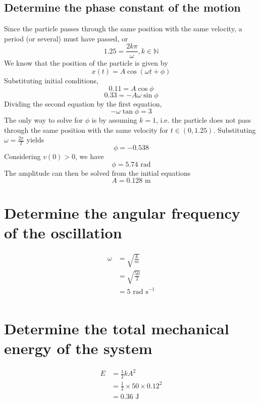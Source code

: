 \documentclass[answers]{exam}
\begin{document}
\begin{questions}
\begin{parts}
		\part{Determine the phase constant of the motion}
	\end{parts}
	\begin{solution}
		Since the particle passes through the same position with the same velocity, a period (or several) must have passed, or
		$$1.25 = \frac{2k\pi}{\omega}, k \in \mathbb{N}$$
		We know that the position of the particle is given by
		$$x(t) = A\cos(\omega t + \phi)$$
		Substituting initial conditions,
		$$0.11 = A\cos\phi$$
		$$0.33 = -A\omega\sin\phi$$
		Dividing the second equation by the first equation,
		$$-\omega\tan\phi = 3$$
		The only way to solve for $\phi$ is by assuming $k=1$, i.e. the particle does not pass through the same position with the same velocity for $t \in (0,1.25)$. Substituting $\omega = \frac{2\pi}{T}$ yields
		$$\phi = -0.538$$
		Considering $v(0) > 0$, we have
		$$\phi = 5.74 \text{ rad}$$
		The amplitude can then be solved from the initial equations
		$$A = 0.128 \text{ m}$$
	\end{solution}
	\begin{parts}
		\part{Determine the angular frequency of the oscillation}
		\begin{solution}
			\begin{align*}
				\omega &= \sqrt{\frac{k}{m}} \\
				       &= \sqrt{\frac{50}{2}} \\
				       &= 5 \text{ rad s}^{-1} \\
			\end{align*}
		\end{solution}
		\part{Determine the total mechanical energy of the system}
		\begin{solution}
			\begin{align*}
				E &= \frac{1}{2} kA^2 \\
				  &= \frac{1}{2} \times 50 \times 0.12^2 \\
				  &= 0.36 \text{ J} \\
			\end{align*}
		\end{solution}

\end{parts}
\end{questions}
\end{document}
